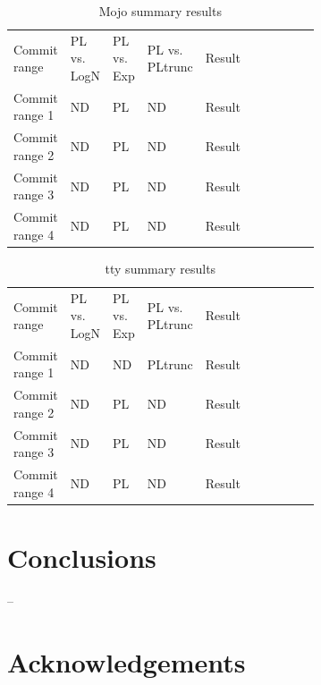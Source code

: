 \documentclass[conference]{IEEEtran}
\begin{document}
\begin{table}[h!tbp]
	\caption{Mojo summary results}
	\begin{center}
		\begin{tabular}{| p{0.12\linewidth} | p{0.08\linewidth} | p{0.08\linewidth} | p{0.08\linewidth} | p{0.1\linewidth} |p{0.13\linewidth} | p{0.09\linewidth} |}
			\hline
                  Commit range & PL vs. LogN & PL vs. Exp & PL vs. PLtrunc & Result \\
                  Commit range 1 &  ND & PL  & ND & Result \\
                  Commit range 2& ND & PL  & ND & Result \\
                  Commit range 3& ND  &  PL & ND & Result \\
                  Commit range 4& ND & PL  & ND & Result \\
			\hline

			\hline
		\end{tabular}
	\end{center}
\label{tab:2019testsmojo}
\end{table}


\begin{table}[h!tbp]
	\caption{tty summary results}
	\begin{center}
		\begin{tabular}{| p{0.12\linewidth} | p{0.08\linewidth} | p{0.08\linewidth} | p{0.08\linewidth} | p{0.1\linewidth} |p{0.13\linewidth} | p{0.09\linewidth} |}
			\hline
                  Commit range & PL vs. LogN & PL vs. Exp & PL vs. PLtrunc & Result \\
                  Commit range 1 & ND & ND  & PLtrunc & Result \\
                  Commit range 2& ND & PL  & ND & Result \\
                  Commit range 3& ND  &  PL & ND & Result \\
                  Commit range 4& ND & PL  & ND & Result \\
			\hline

			\hline
		\end{tabular}
	\end{center}
\label{tab:2019teststty}
\end{table}




\section{Conclusions}\label{conc}
--

\section{Acknowledgements}

 
\end{document}
